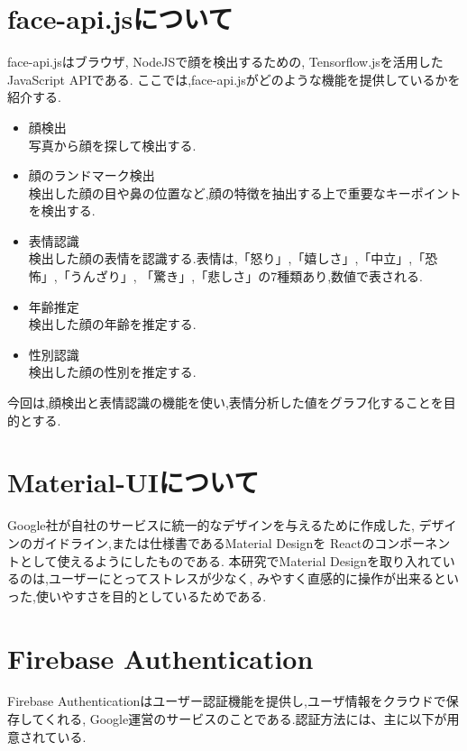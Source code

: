 \section{face-api.jsについて}
\label{sec:reference_bib}
face-api.jsはブラウザ, NodeJSで顔を検出するための,
Tensorflow.jsを活用したJavaScript APIである.
ここでは,face-api.jsがどのような機能を提供しているかを紹介する.
\begin{itemize}
	\item 顔検出 \\
	写真から顔を探して検出する. \\

	\item 顔のランドマーク検出 \\
	検出した顔の目や鼻の位置など,顔の特徴を抽出する上で重要なキーポイントを検出する. \\

	\item 表情認識 \\
	検出した顔の表情を認識する.表情は,「怒り」,「嬉しさ」,「中立」,「恐怖」,「うんざり」,
	「驚き」,「悲しさ」の7種類あり,数値で表される. \\

	\item 年齢推定 \\
	検出した顔の年齢を推定する. \\

	\item 性別認識 \\
	検出した顔の性別を推定する. \\

\end{itemize}
今回は,顔検出と表情認識の機能を使い,表情分析した値をグラフ化することを目的とする.
	
\section{Material-UIについて}
\label{sec:reference_material}
Google社が自社のサービスに統一的なデザインを与えるために作成した,
デザインのガイドライン,または仕様書であるMaterial Designを
Reactのコンポーネントとして使えるようにしたものである.
本研究でMaterial Designを取り入れているのは,ユーザーにとってストレスが少なく,
みやすく直感的に操作が出来るといった,使いやすさを目的としているためである.

\section{Firebase Authentication}
\label{sec:reference_auth}
Firebase Authenticationはユーザー認証機能を提供し,ユーザ情報をクラウドで保存してくれる,
Google運営のサービスのことである.認証方法には、主に以下が用意されている.

